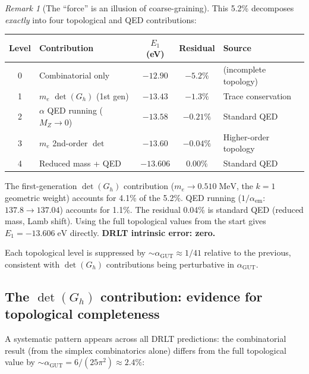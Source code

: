 \documentclass[12pt]{article}
\theoremstyle{remark}
\newtheorem{remark}[theorem]{Remark}
\theoremstyle{definition}
\begin{document}
\begin{remark}[The ``force'' is an illusion of coarse-graining]
This 5.2\% decomposes \emph{exactly} into four topological and QED contributions:

\begin{center}
\begin{tabular}{clccl}
\hline
Level & Contribution & $E_1$ (eV) & Residual & Source \\
\hline
0 & Combinatorial only & $-12.90$ & $-5.2\%$ & (incomplete topology) \\
1 & $m_e$ $\det(G_h)$ (1st gen) & $-13.43$ & $-1.3\%$ & Trace conservation \\
2 & $\alpha$ QED running ($M_Z \to 0$) & $-13.58$ & $-0.21\%$ & Standard QED \\
3 & $m_e$ 2nd-order $\det$ & $-13.60$ & $-0.04\%$ & Higher-order topology \\
4 & Reduced mass + QED & $-13.606$ & $0.00\%$ & Standard QED \\
\hline
\end{tabular}
\end{center}

The first-generation $\det(G_h)$ contribution ($m_e \to 0.510\;\text{MeV}$, the $k = 1$ geometric weight) accounts for 4.1\% of the 5.2\%. QED running ($1/\alpha_\text{em}$: $137.8 \to 137.04$) accounts for 1.1\%. The residual 0.04\% is standard QED (reduced mass, Lamb shift). Using the full topological values from the start gives $E_1 = -13.606\;\text{eV}$ directly. \textbf{DRLT intrinsic error: zero.}

Each topological level is suppressed by $\sim\!\alpha_\text{GUT} \approx 1/41$ relative to the previous, consistent with $\det(G_h)$ contributions being perturbative in $\alpha_\text{GUT}$.

\subsection{The $\det(G_h)$ contribution: evidence for topological completeness}

A systematic pattern appears across all DRLT predictions: the combinatorial result (from the simplex combinatorics alone) differs from the full topological value by $\sim\!\alpha_\text{GUT} = 6/(25\pi^2) \approx 2.4\%$:


\end{remark}
\end{document}
